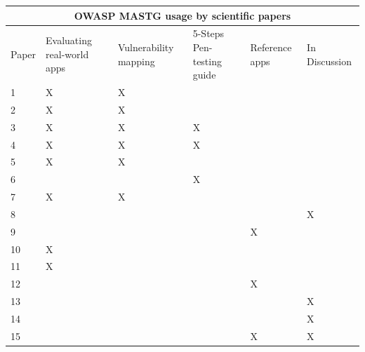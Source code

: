 \begin{tabular}{ |p{1.2cm}||p{2cm}|p{2cm}|p{2cm}|p{2cm}|p{2cm}|  }
    \hline
    \multicolumn{6}{|c|}{OWASP MASTG usage by scientific papers} \\
    \hline
    Paper & Evaluating real-world apps & Vulnerability mapping & 5-Steps Pen-testing guide & Reference apps & In Discussion \\
    \hline
    1 \citep{paper_01}   &  X   & X &   &   &   \\
    \hline
    2 \citep{paper_02}   &  X   & X &   &   &   \\
    \hline
    3 \citep{paper_03}   &  X   & X &  X &   &   \\
    \hline
    4 \citep{paper_04}   &  X   & X &  X &   &   \\
    \hline
    5 \citep{paper_05}   &  X   & X &   &   &   \\
    \hline
    6 \citep{paper_06}   &     &  &  X &   &   \\
    \hline
    7 \citep{paper_07}   &  X   & X &   &   &   \\
    \hline
    8 \citep{paper_08}   &     &  &   &   &  X \\
    \hline
    9 \citep{paper_10}   &     &  &   &  X &   \\
    \hline
    10 \citep{paper_13}   &  X   &  &   &   &   \\
    \hline
    11 \citep{paper_14}   &  X   &  &   &   &   \\
    \hline
    12 \citep{paper_19}   &     &  &   &  X &   \\
    \hline
    13 \citep{paper_20}   &     &  &   &   &  X \\
    \hline
    14 \citep{paper_21}   &     &  &   &   &  X \\
    \hline
    15 \citep{paper_22}   &     &  &   &  X &  X \\
    \hline
\end{tabular}

